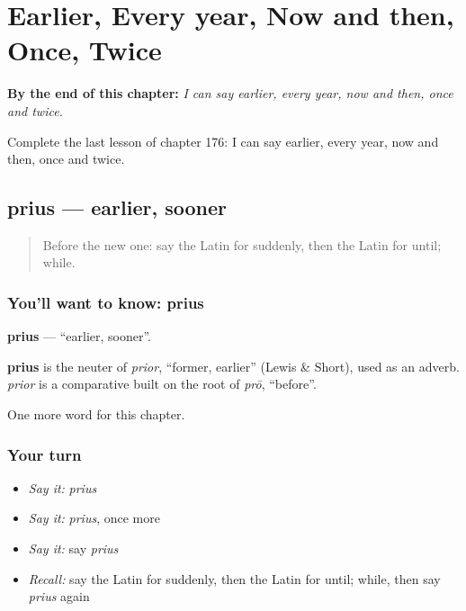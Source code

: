 
\chapter{Earlier, Every year, Now and then, Once, Twice}
\label{ch:la-earlier-every-year-now-and-then-once-twice}

\begin{chapteropening}
\textbf{By the end of this chapter:} \emph{I can say earlier, every year, now and then, once and twice.}

Complete the last lesson of chapter 176: I can say earlier, every year, now and then, once and twice.
\end{chapteropening}

\section[prius]{prius — earlier, sooner}

\label{lesson:LA-C176-prius}



\begin{quote}
Before the new one: say the Latin for suddenly, then the Latin for until; while.
\end{quote}

\subsection*{You'll want to know: prius}
\textbf{prius} — \textquotedblleft{}earlier, sooner\textquotedblright{}.

\begin{cousinweb}
\textbf{prius} is the neuter of \emph{prior}, \textquotedblleft{}former, earlier\textquotedblright{} (Lewis \& Short), used as an adverb. \emph{prior} is a comparative built on the root of \emph{prō}, \textquotedblleft{}before\textquotedblright{}.
\end{cousinweb}

\begin{grammarlens}[title={What you've built}]
One more word for this chapter.
\end{grammarlens}

\subsection*{Your turn}
\begin{itemize}
\raggedright
  \item \emph{Say it:} \emph{prius}
  \item \emph{Say it:} \emph{prius}, once more
  \item \emph{Say it:} say \emph{prius}
  \item \emph{Recall:} say the Latin for suddenly, then the Latin for until; while, then say \emph{prius} again
\end{itemize}

